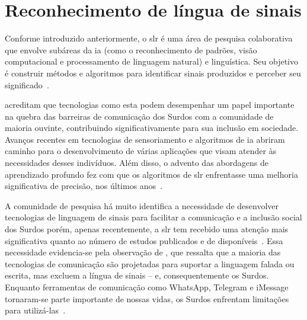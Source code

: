 \section{Reconhecimento de língua de sinais}
\label{sec:slr}

Conforme introduzido anteriormente, o \acrfull{slr} é uma área de pesquisa colaborativa que envolve subáreas da \acrfull{ia} (como o reconhecimento de padrões, visão computacional e processamento de linguagem natural) e linguística. Seu objetivo é construir métodos e algoritmos para identificar sinais produzidos e perceber seu significado~\cite{wadhawan-2019-slr-literature-review}. 

 acreditam que tecnologias como esta podem desempenhar um papel importante na quebra das barreiras de comunicação dos Surdos com a comunidade de maioria ouvinte, contribuindo significativamente para sua inclusão em sociedade. Avanços recentes em tecnologias de sensoriamento e algoritmos de \acrshort{ia} abriram caminho para o desenvolvimento de várias aplicações que visam atender às necessidades desses indivíduos. Além disso, o advento das abordagens de aprendizado profundo fez com que os algoritmos de \acrshort{slr} enfrentasse uma melhoria significativa de precisão, nos últimos anos~\cite{papastratis-2021-ai-technologies-sl,rastgoo-2021-slr-deep-survey,bragg-2019-slr-interdisciplinary}.

A comunidade de pesquisa há muito identifica a necessidade de desenvolver tecnologias de linguagem de sinais para facilitar a comunicação e a inclusão social dos Surdos porém, apenas recentemente, a \acrshort{slr} tem recebido uma atenção mais significativa quanto ao número de estudos publicados e de \datasets disponíveis~\cite{papastratis-2021-ai-technologies-sl,koller-2020-quantitative-survey-slr}.
Essa necessidade evidencia-se pela observação de , que ressalta que a maioria das tecnologias de comunicação são projetadas para suportar a linguagem falada ou escrita, mas excluem a língua de sinais -- e, consequentemente os Surdos. Enquanto ferramentas de comunicação como WhatsApp, Telegram e iMessage tornaram-se parte importante de nossas vidas, os Surdos enfrentam limitações para utilizá-las~\cite{rastgoo-2021-slr-deep-survey,bragg-2019-slr-interdisciplinary}.





